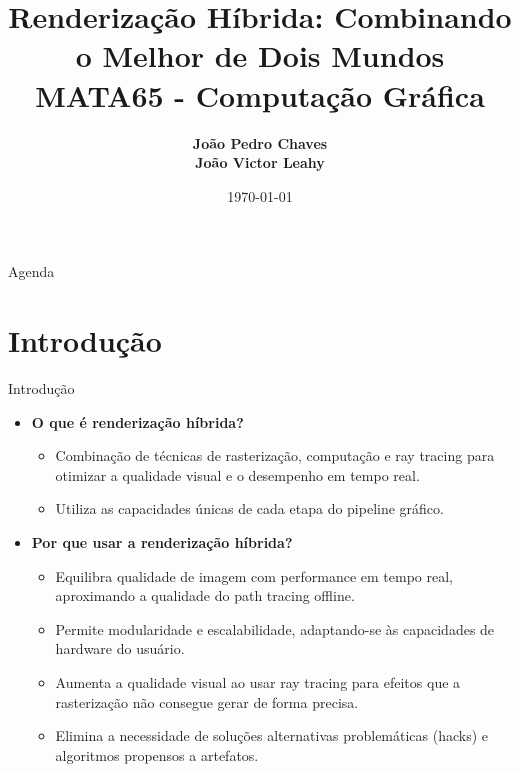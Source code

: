 \documentclass[aspectratio=169,xcolor=table]{beamer}
\author[Chaves, Leahy]{%
  \textbf{João Pedro Chaves} \\
  \textbf{João Victor Leahy}
}
\title{Renderização Híbrida: Combinando o Melhor de Dois Mundos \\ \large{MATA65 - Computação Gráfica}}
\institute{Universidade Federal da Bahia \\ Instituto de Computação}
\date{\today}
\begin{document}
\begin{frame}
    \titlepage
\end{frame}

\begin{frame}{Agenda}
    \tableofcontents
\end{frame}

\section{Introdução}
\begin{frame}{Introdução}
    \begin{itemize}
        \item \textbf{O que é renderização híbrida?}
        \begin{itemize}
            \item Combinação de técnicas de rasterização, computação e ray tracing para otimizar a qualidade visual e o desempenho em tempo real.
            \item Utiliza as capacidades únicas de cada etapa do pipeline gráfico.
        \end{itemize}
        \item \textbf{Por que usar a renderização híbrida?}
        \begin{itemize}
            \item Equilibra qualidade de imagem com performance em tempo real, aproximando a qualidade do path tracing offline.
            \item Permite modularidade e escalabilidade, adaptando-se às capacidades de hardware do usuário.
            \item Aumenta a qualidade visual ao usar ray tracing para efeitos que a rasterização não consegue gerar de forma precisa.
            \item Elimina a necessidade de soluções alternativas problemáticas (hacks) e algoritmos propensos a artefatos.
        \end{itemize}
    \end{itemize}
\end{frame}

\end{document}
